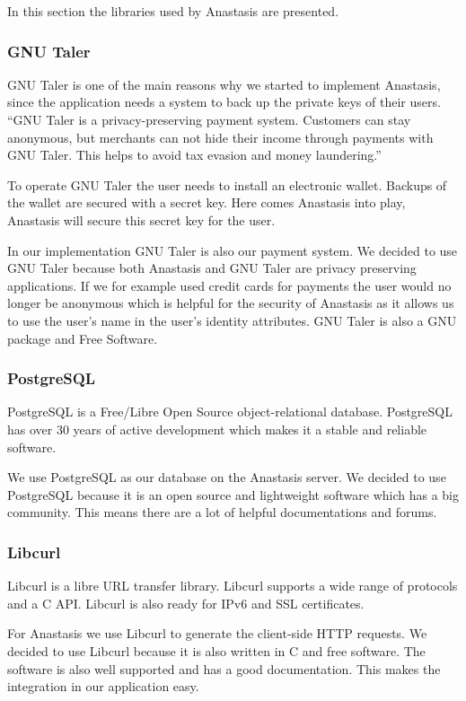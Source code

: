 In this section the libraries used by Anastasis are presented.

\subsubsection{GNU Taler}

GNU Taler is one of the main reasons why we started to implement
Anastasis, since the application needs a system to back up the private
keys of their users.  ``GNU Taler is a privacy-preserving payment
system. Customers can stay anonymous, but merchants can not hide their
income through payments with GNU Taler. This helps to avoid tax
evasion and money laundering.''~\cite{gnu_taler}

To operate GNU Taler the user needs to install an electronic
wallet. Backups of the wallet are secured with a secret key. Here
comes Anastasis into play, Anastasis will secure this secret key for
the user.

In our implementation GNU Taler is also our payment system. We decided
to use GNU Taler because both Anastasis and GNU Taler are privacy
preserving applications. If we for example used credit cards for
payments the user would no longer be anonymous which is helpful for
the security of Anastasis as it allows us to use the user's name in
the user's identity attributes.  GNU Taler is also a GNU package
and Free Software.~\cite{gnu_taler}
\newpage
\subsubsection{PostgreSQL}

PostgreSQL is a Free/Libre Open Source object-relational
database. PostgreSQL has over 30 years of active development which
makes it a stable and reliable software.

We use PostgreSQL as our database on the Anastasis server. We decided
to use PostgreSQL because it is an open source and lightweight
software which has a big community.  This means there are a lot of
helpful documentations and forums.~\cite{postgresql}

\subsubsection{Libcurl}

Libcurl is a libre URL transfer library. Libcurl supports a wide range
of protocols and a C API. Libcurl is also ready for IPv6 and SSL
certificates.

For Anastasis we use Libcurl to generate the client-side HTTP
requests. We decided to use Libcurl because it is also written in C
and free software. The software is also well supported and has a good
documentation.  This makes the integration in our application
easy.~\cite{libcurl}

